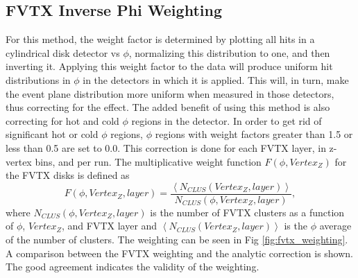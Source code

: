 \subsection{FVTX Inverse Phi Weighting}
\label{sec:FVTX_inv_phi_weight}
For this method, the weight factor is determined by plotting all hits in a cylindrical disk detector vs $\phi$, normalizing this distribution to one, and then inverting it. Applying this weight factor to the data will produce uniform hit distributions in $\phi$ in the detectors in which it is applied. This will, in turn, make the event plane distribution more uniform when measured in those detectors, thus correcting for the effect. The added benefit of using this method is also correcting for hot and cold $\phi$ regions in the detector. In order to get rid of significant hot or cold $\phi$ regions, $\phi$ regions with weight factors greater than 1.5 or less than 0.5 are set to 0.0. This correction is done for each FVTX layer, in z-vertex bins, and per run. The multiplicative weight function $F(\phi,Vertex_Z)$ for the FVTX disks is defined as 
\begin{equation}
F(\phi,Vertex_Z,layer) = \frac{\left<N_{CLUS}(Vertex_Z,layer)\right>}{N_{CLUS}(\phi,Vertex_Z,layer)},
\end{equation}
where $N_{CLUS}(\phi,Vertex_Z,layer)$ is the number of FVTX clusters as a function of $\phi$, $Vertex_Z$, and FVTX layer and $\left<N_{CLUS}(Vertex_Z,layer)\right>$ is the $\phi$ average of the number of clusters. The weighting can be seen in Fig \ref{fig:fvtx_weighting}. A comparison between the FVTX weighting and the analytic correction is shown. The good agreement indicates the validity of the weighting.

